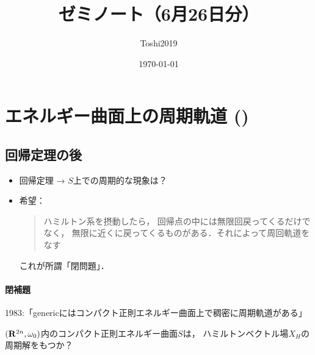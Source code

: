 \newcommand{\cotn}[1][]{\dot{T}^{\ast}{#1}}


\newcommand{\muhom}{\mu hom}
\newcommand{\muHom}[1][]{\mathrm{Hom}^\mu_{\raise1.5ex\hbox to.1em{}#1}}

\newcommand{\mucat}[2][]{\mathsf{D}^{\mathrm{b}}_{#1}(#2)}

\newcommand{\conv}[1][]{\mathbin{\mathop{\circ}\limits_{#1}}}

\newcommand{\torus}{\mathbf{T}}



\title{ゼミノート（6月26日分）}
\author{Toshi2019}
\date{\today}

\maketitle
\tableofcontents

\section{エネルギー曲面上の周期軌道 (\cite[\S1.4]{HZ94})}

\subsection*{回帰定理の後}

\begin{itemize}
    \item 回帰定理 → \(S\)上での周期的な現象は？
    \item 希望：\begin{quote}
        ハミルトン系を摂動したら，
        回帰点の中には無限回戻ってくるだけでなく，
        無限に近くに戻ってくるものがある．それによって周回軌道をなす
    \end{quote}これが所謂「閉問題」．
\end{itemize}

\paragraph{閉補題}1983:「genericにはコンパクト正則エネルギー曲面上で稠密に周期軌道がある」

\begin{Qn*}
    \((\mathbf{R}^{2n},\omega_{0})\)内のコンパクト正則エネルギー曲面\(S\)は，
    ハミルトンベクトル場\(X_H\)の周期解をもつか？
\end{Qn*}

